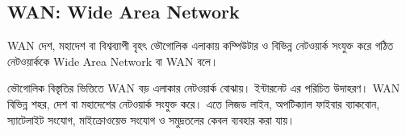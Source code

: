 \subsection{WAN: Wide Area Network}

\begin{definitionbox}{WAN}
দেশ, মহাদেশ বা বিশ্বব্যাপী বৃহৎ ভৌগোলিক এলাকায় কম্পিউটার ও বিভিন্ন নেটওয়ার্ক সংযুক্ত করে গঠিত নেটওয়ার্ককে Wide Area Network বা WAN বলে।
\end{definitionbox}

ভৌগোলিক বিস্তৃতির ভিত্তিতে WAN বড় এলাকার নেটওয়ার্ক বোঝায়। ইন্টারনেট এর পরিচিত উদাহরণ। WAN বিভিন্ন শহর, দেশ বা মহাদেশের নেটওয়ার্ক সংযুক্ত করে। এতে লিজড লাইন, অপটিক্যাল ফাইবার ব্যাকবোন, স্যাটেলাইট সংযোগ, মাইক্রোওয়েভ সংযোগ ও সমুদ্রতলের কেবল ব্যবহার করা যায়।




